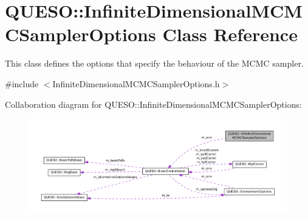 \hypertarget{class_q_u_e_s_o_1_1_infinite_dimensional_m_c_m_c_sampler_options}{\section{Q\-U\-E\-S\-O\-:\-:Infinite\-Dimensional\-M\-C\-M\-C\-Sampler\-Options Class Reference}
\label{class_q_u_e_s_o_1_1_infinite_dimensional_m_c_m_c_sampler_options}
}


This class defines the options that specify the behaviour of the M\-C\-M\-C sampler.  




{\ttfamily \#include $<$Infinite\-Dimensional\-M\-C\-M\-C\-Sampler\-Options.\-h$>$}



Collaboration diagram for Q\-U\-E\-S\-O\-:\-:Infinite\-Dimensional\-M\-C\-M\-C\-Sampler\-Options\-:
\nopagebreak
\begin{figure}[H]
\begin{center}
\leavevmode
\includegraphics[width=350pt]{class_q_u_e_s_o_1_1_infinite_dimensional_m_c_m_c_sampler_options__coll__graph}
\end{center}
\end{figure}

